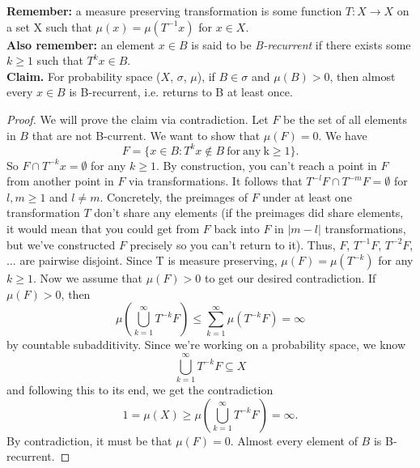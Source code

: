 \documentclass{article}
\begin{document}
\textbf{Remember:} a measure preserving transformation is some function $T : X \rightarrow X$ on a set X such that
$\mu(x) = \mu(T^{-1}x)$ for $x \in X$.
\\
\textbf{Also remember:} an element $x \in B$ is said to be \textit{B-recurrent} if there exists some $k \geq 1$
such that $T^{k}x \in B$. 
\\
\textbf{Claim.} For probability space ($X$, $\sigma$, $\mu$), if $B \in \sigma$ and $\mu(B) > 0$, then almost every $x \in B$ is B-recurrent, i.e. returns to B at least once. 
\begin{proof}
We will prove the claim via contradiction. Let $F$ be the set of all elements in $B$ that are not B-current.
We want to show that $\mu(F) = 0$. We have $$ F = \{x \in B : T^{k}x \not\in B\ \mathrm{for\ any\ k \geq 1\}}.$$ 
So $F \cap T^{-k}x = \emptyset$ for any $k \geq 1$. By construction, you can't reach a point in $F$ from another point in $F$ via transformations. 
It follows that $T^{-l}F \cap T^{-m}F = \emptyset$ for $l, m \geq 1$ and $l \neq m$. Concretely, the preimages of $F$ under at least one transformation $T$ 
don't share any elements (if the preimages did share elements, it would mean that you could get from $F$ back into $F$ in $|m - l|$ transformations, but
we've constructed $F$ precisely so you can't return to it). 
Thus, $F$, $T^{-1}F$, $T^{-2}F$, $...$ are pairwise disjoint. Since T is measure preserving, $\mu(F) = \mu(T^{-k})$ for any $k \geq 1$. 
Now we assume that $\mu(F) > 0$ to get our desired contradiction. 
If $\mu(F) > 0$, then $$\mu(\bigcup\limits_{k=1}^{\infty} T^{-k}F) \leq \sum\limits_{k = 1}^{\infty} \mu(T^{-k}F) = \infty$$ by countable subadditivity.
Since we're working on a probability space, we know $$\bigcup\limits_{k=1}^{\infty}T^{-k}F \subseteq X$$ and following this to its end, we get the contradiction
$$1 = \mu(X) \geq \mu(\bigcup\limits_{k=1}^{\infty}T^{-k}F) = \infty.$$ By contradiction, it must be that $\mu(F) = 0$. 
Almost every element of $B$ is B-recurrent. 

\end{proof}
\end{document}
